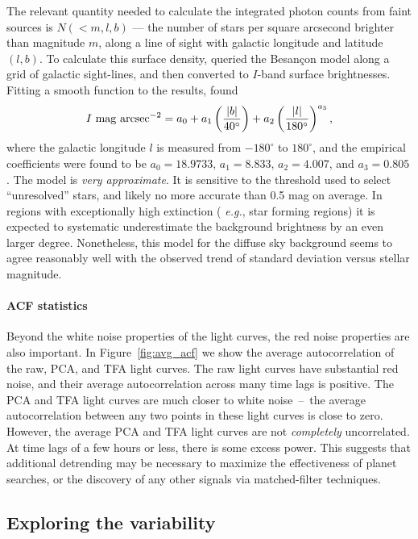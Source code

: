 \documentclass[12pt,twocolumn,tighten,trackchanges]{aastex62}
\begin{document}
The relevant quantity needed to calculate the integrated photon counts
from faint sources is  $N(<m,l,b)$ --- the number of stars per square
arcsecond brighter than magnitude $m$, along a line of sight with
galactic longitude and latitude $(l,b)$.  To calculate this surface
density, \citet{winn_background_2013} queried the Besan\c con model
\citep{robin_synthetic_2003}  along a grid of galactic sight-lines,
and then converted to $I$-band surface brightnesses.  Fitting a smooth
function to the results, \citet{winn_background_2013} found
\begin{equation}
  I\ {\rm mag\ arcsec}^{-2} =
      a_0 + a_1 \left(\frac{|b|}{40^\circ}\right)
      + a_2 \left(\frac{|l|}{180^\circ}\right)^{a_3},
\end{equation}
where the galactic longitude $l$ is measured from $-180^\circ$ to
$180^\circ$, and the empirical coefficients were found to be $a_0 =
18.9733$, $a_1=8.833$, $a_2=4.007$, and $a_3=0.805$.  The model is
{\it very approximate}.  It is sensitive to the threshold used to
select ``unresolved'' stars, and likely no more accurate than 0.5 mag
on average.  In regions with exceptionally high extinction ({\it
e.g.}, star forming regions) it is expected to systematic
underestimate the background brightness by an even larger degree.
Nonetheless, this model for the diffuse sky background seems to agree
reasonably well with the observed trend of standard deviation versus
stellar magnitude.


\paragraph{ACF statistics}

Beyond the white noise properties of the light curves, the red noise
properties are also important.  In Figure~\ref{fig:avg_acf} we show
the average autocorrelation of the raw, PCA, and TFA light curves.
The raw light curves have substantial red noise, and their average
autocorrelation across many time lags is positive.  The PCA and TFA
light curves are much closer to white noise~--~the average
autocorrelation between any two points in these light curves is close
to zero.  However, the average PCA and TFA light curves are not {\it
completely} uncorrelated.  At time lags of a few hours or less, there
is some excess power.  This suggests that additional detrending may be
necessary to maximize the effectiveness of planet searches, or the
discovery of any other signals via matched-filter techniques.


\subsection{Exploring the variability}
\label{subsec:identifying_variability}
\end{document}

